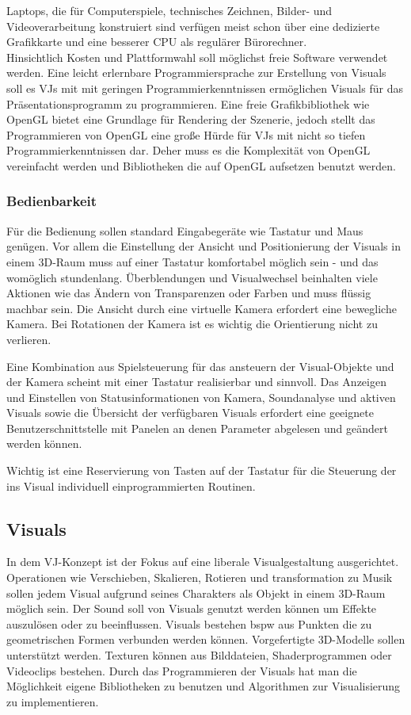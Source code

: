 Laptops, die f\"ur Computerspiele, technisches Zeichnen, Bilder- und Videoverarbeitung  konstruiert sind
verf\"ugen meist schon \"uber eine dedizierte Grafikkarte und eine besserer CPU als regul\"arer B\"urorechner.
\\
Hinsichtlich Kosten und Plattformwahl soll m\"oglichst freie Software verwendet werden. Eine leicht erlernbare
Programmiersprache zur Erstellung von Visuals soll es VJs mit mit geringen Programmierkenntnissen erm\"oglichen Visuals
f\"ur das Pr\"asentationsprogramm zu programmieren. Eine freie Grafikbibliothek wie OpenGL bietet eine Grundlage f\"ur
Rendering der Szenerie, jedoch stellt das Programmieren von OpenGL eine gro\ss e H\"urde f\"ur VJs mit nicht so tiefen
Programmierkenntnissen dar. Deher muss es die Komplexit\"at von OpenGL vereinfacht werden und Bibliotheken die auf OpenGL
aufsetzen benutzt werden.


\subsubsection{Bedienbarkeit}

F\"ur die Bedienung sollen standard Eingabeger\"ate wie Tastatur und Maus gen\"ugen. Vor allem die Einstellung der Ansicht
und Positionierung der Visuals in einem 3D-Raum muss auf einer Tastatur komfortabel m\"oglich sein - und das
wom\"oglich stundenlang. \"Uberblendungen und Visualwechsel beinhalten viele Aktionen wie das \"Andern von Transparenzen oder
Farben und muss fl\"ussig machbar sein. Die Ansicht durch eine virtuelle Kamera erfordert eine bewegliche Kamera. Bei
Rotationen der Kamera ist es wichtig die Orientierung nicht zu verlieren.

Eine Kombination aus Spielsteuerung f\"ur das ansteuern der Visual-Objekte und der Kamera scheint mit einer Tastatur
realisierbar und sinnvoll. Das Anzeigen und Einstellen von Statusinformationen von Kamera,
Soundanalyse und aktiven Visuals sowie die \"Ubersicht der verf\"ugbaren Visuals erfordert eine geeignete
Benutzerschnittstelle mit Panelen an denen Parameter abgelesen und ge\"andert werden k\"onnen.

Wichtig ist eine Reservierung von Tasten auf der Tastatur  f\"ur die Steuerung der ins Visual individuell einprogrammierten
Routinen.


\subsection{Visuals}

In dem VJ-Konzept ist der Fokus auf eine liberale Visualgestaltung ausgerichtet. Operationen wie Verschieben, Skalieren,
Rotieren und transformation zu Musik sollen jedem Visual aufgrund seines Charakters als Objekt in einem 3D-Raum m\"oglich sein.
Der Sound
soll von Visuals genutzt werden k\"onnen um Effekte auszul\"osen oder zu beeinflussen. Visuals bestehen bspw aus Punkten die zu
geometrischen Formen verbunden werden k\"onnen. Vorgefertigte 3D-Modelle sollen unterst\"utzt werden. Texturen k\"onnen
aus Bilddateien, Shaderprogrammen oder Videoclips bestehen. Durch das Programmieren der Visuals hat man
die M\"oglichkeit eigene Bibliotheken zu benutzen und Algorithmen zur Visualisierung zu implementieren.

